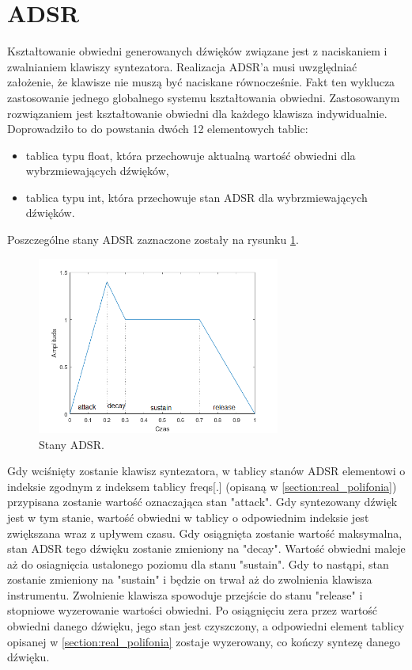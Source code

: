 \section{ADSR}\label{sec:real_adsr}
Kształtowanie obwiedni generowanych dźwięków związane jest z naciskaniem i zwalnianiem klawiszy syntezatora. Realizacja ADSR'a musi uwzględniać założenie, że klawisze nie muszą być naciskane równocześnie. Fakt ten wyklucza zastosowanie jednego globalnego systemu kształtowania obwiedni. Zastosowanym rozwiązaniem jest kształtowanie obwiedni dla każdego klawisza indywidualnie. Doprowadziło to do powstania dwóch 12 elementowych tablic:
\begin{itemize}
	\item tablica typu float, która przechowuje aktualną wartość obwiedni dla wybrzmiewających dźwięków,
	\item tablica typu int, która przechowuje stan ADSR dla wybrzmiewających dźwięków.
\end{itemize}
Poszczególne stany ADSR zaznaczone zostały na rysunku \ref{rys:real_adsr}.
\begin{figure}[H]
	\centering
	\includegraphics[width=8cm]{./grafiki/real_adsr}
	\captionsetup{justification=centering}
	\caption{Stany ADSR.}
	\label{rys:real_adsr}
\end{figure}
Gdy wciśnięty zostanie klawisz syntezatora, w tablicy stanów ADSR elementowi o indeksie zgodnym z indeksem tablicy freqs[.] (opisaną w \ref{section:real_polifonia}) przypisana zostanie wartość oznaczająca stan "attack". Gdy syntezowany dźwięk jest w tym stanie, wartość obwiedni w tablicy o odpowiednim indeksie jest zwiększana wraz z upływem czasu. Gdy osiągnięta zostanie wartość maksymalna, stan ADSR tego dźwięku zostanie zmieniony na "decay". Wartość obwiedni maleje aż do osiagnięcia ustalonego poziomu dla stanu "sustain". Gdy to nastąpi, stan zostanie zmieniony na "sustain" i będzie on trwał aż do zwolnienia klawisza instrumentu. Zwolnienie klawisza spowoduje przejście do stanu "release" i stopniowe wyzerowanie wartości obwiedni. Po osiągnięciu zera przez wartość obwiedni danego dźwięku, jego stan jest czyszczony, a odpowiedni element tablicy opisanej w \ref{section:real_polifonia} zostaje wyzerowany, co kończy syntezę danego dźwięku.

